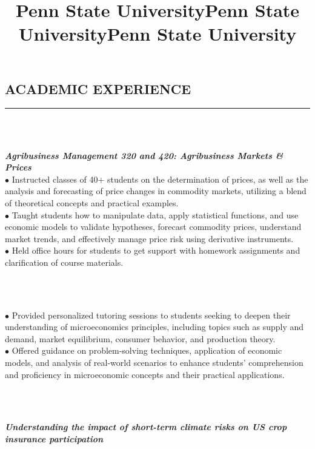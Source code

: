 \documentclass[overlapped]{res}
\begin{document}
\begin{resume}
\section{ACADEMIC EXPERIENCE}
\vspace{-3 mm}
\noindent\rule{\textwidth}{1pt}\\[-8 mm]
\title{\textbf{Penn State University}}
\begin{position}\\[-2 mm]
\textbf{\textit{Agribusiness Management 320 and 420: Agribusiness Markets \& Prices}}\\
$\bullet$ Instructed classes of 40+ students on the determination of prices, as well as the analysis and forecasting of price changes in commodity markets, utilizing a blend of theoretical concepts and practical examples.\\
$\bullet$ Taught students how to manipulate data, apply statistical functions, and use economic models to validate hypotheses, forecast commodity prices, understand market trends, and effectively manage price risk using derivative instruments.\\
$\bullet$ Held office hours for students to get support with homework assignments and clarification of course materials.
\end{position}\\[-8.5mm]
\title{\textbf{Penn State University}}
\begin{position}\\[-2 mm]
$\bullet$ Provided personalized tutoring sessions to students seeking to deepen their understanding of microeconomics principles, including topics such as supply and demand, market equilibrium, consumer behavior, and production theory.\\
$\bullet$  Offered guidance on problem-solving techniques, application of economic models, and analysis of real-world scenarios to enhance students' comprehension and proficiency in microeconomic concepts and their practical applications.
\end{position}\\[-8.5 mm]
\title{\textbf{Penn State University}}
\begin{position}\\[-2 mm]
\textbf{\textit{Understanding the impact of short-term climate risks on US crop insurance participation}}\\

\end{position}
\end{resume}
\end{document}
